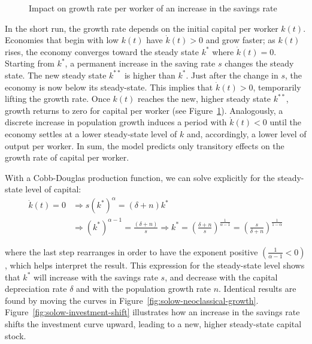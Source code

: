 \documentclass[\topdir/lecture\_notes.tex]{subfiles}
\begin{document}
\begin{figure}[h]
\begin{center}
  \caption{Impact on growth rate per worker of an increase in the savings rate}
  \label{fig:solow-savings-impact}
\end{center}
\end{figure}

In the short run, the growth rate depends on the initial capital per worker \(k(t)\).
Economies that begin with low \(k(t)\) have \(\dot{k}(t)>0\) and grow faster; as \(k(t)\) rises, the economy converges toward the steady state \(k^{*}\) where \(\dot{k}(t)=0\).
Starting from \(k^{*}\), a permanent increase in the saving rate \(s\) changes the steady state.
The new steady state \(k^{**}\) is higher than \(k^{*}\).
Just after the change in \(s\), the economy is now below its steady-state.
This implies that \(\dot{k}(t)>0\), temporarily lifting the growth rate.
Once \(k(t)\) reaches the new, higher steady state \(k^{**}\), growth returns to zero for capital per worker (see Figure~\ref{fig:solow-savings-impact}).
Analogously, a discrete increase in population growth induces a period with \(\dot{k}(t)<0\) until the economy settles at a lower steady-state level of \(k\) and, accordingly, a lower level of output per worker.
In sum, the model predicts only transitory effects on the growth rate of capital per worker.

With a Cobb-Douglas production function, we can solve explicitly for the steady-state level of capital:
\begin{equation}
\begin{aligned}
\dot{k}(t)=0 & \Longrightarrow s\left(k^{*}\right)^{\alpha}=(\delta+n) k^{*} \\
& \Longrightarrow\left(k^{*}\right)^{\alpha-1}=\frac{(\delta+n)}{s} \Longrightarrow k^{*}=\left(\frac{\delta+n}{s}\right)^{\frac{1}{\alpha-1}} =\left(\frac{s}{\delta+n}\right)^{\frac{1}{1-\alpha}}
\end{aligned}
\label{eq:solow-steady-state-k}
\end{equation}

where the last step rearranges in order to have the exponent positive \(\left(\frac{1}{\alpha-1}<0\right)\), which helps interpret the result. This expression for the steady-state level shows that \(k^{*}\) will increase with the savings rate \(s\), and decrease with the capital depreciation rate \(\delta\) and with the population growth rate \(n\). Identical results are found by moving the curves in Figure~\ref{fig:solow-neoclassical-growth}. Figure~\ref{fig:solow-investment-shift} illustrates how an increase in the savings rate shifts the investment curve upward, leading to a new, higher steady-state capital stock.
\end{document}

